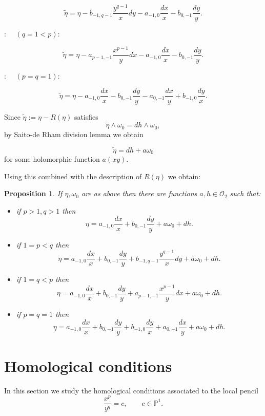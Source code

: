 \documentclass[11pt,a4paper]{amsart}
\newtheorem{proposition}[theorem]{Proposition}
\theoremstyle{definition}
\begin{document}
\[
\tilde{\eta}
=
\eta
-
b_{-1,q-1}\frac{y^{q-1}}{x}dy
-
a_{-1,0}\frac{dx}{x}
-
b_{0,-1}\frac{dy}{y}.
\]

 : $\quad (q=1<p) :$

\[
\tilde{\eta}
=
\eta
-
a_{p-1,-1}\frac{x^{p-1}}{y}dx
-
a_{-1,0}\frac{dx}{x}
-
b_{0,-1}\frac{dy}{y}.
\]

 : $\quad (p=q=1) :$

\[
\tilde{\eta}
=
\eta
-
a_{-1,0}\frac{dx}{x}
-
b_{0,-1}\frac{dy}{y}
-
a_{0,-1}\frac{dx}{y}
+
b_{-1,0}\frac{dy}{x}.
\]


 Since $\tilde{\eta}:=\eta-R(\eta)$ satisfies
\[
\tilde{\eta}\wedge \omega_0 = dh\wedge \omega_0,
\]
by Saito-de Rham division lemma \cite{[Saito]} we obtain

\[
\tilde{\eta} = dh + a \omega_0
\]
for some holomorphic function $a(xy)$.

Using this combined with the description of $R(\eta)$ we obtain:


\begin{proposition} If $\eta,\omega_0$ are as above then there are functions
$a,h\in\mathcal{O}_2$ such that:
\begin{itemize}
\item[{\rm(1)}] if $p>1,q>1$ then
\[
\eta
=
a_{-1,0}\frac{dx}{x}
+
b_{0,-1}\frac{dy}{y}
+
a\omega_0
+
dh.
\]

\item[{\rm(2)}] if $1=p<q$ then
\[
\eta
=
a_{-1,0}\frac{dx}{x}
+
b_{0,-1}\frac{dy}{y}
+
b_{-1,q-1}\frac{y^{q-1}}{x}dy
+
a\omega_0
+
dh.
\]

\item[{\rm(3)}] if $1=q<p$ then
\[
\eta
=
a_{-1,0}\frac{dx}{x}
+
b_{0,-1}\frac{dy}{y}
+
a_{p-1,-1}\frac{x^{p-1}}{y}dx
+
a\omega_0
+
dh.
\]

\item[{\rm(4)}] if $p=q=1$ then
\[
\eta
=
a_{-1,0}\frac{dx}{x}
+
b_{0,-1}\frac{dy}{y}
+
b_{-1,0}\frac{dy}{x}
+
a_{0,-1}\frac{dx}{y}
+
a\omega_0
+
dh.
\]
\end{itemize}
\end{proposition}




\section{Homological conditions}
\label{section:homoleq}
In this section we study the homological conditions associated to the local pencil
\[
\frac{x^p}{y^q}=c,\qquad c\in\mathbb{P}^1.
\]
\end{document}
